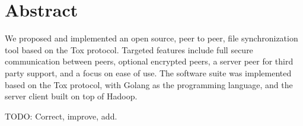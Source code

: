 \section*{Abstract}
\label{chap:abstract}

We proposed and implemented an open source, peer to peer, file synchronization tool based on the Tox protocol.
Targeted features include full secure communication between peers, optional encrypted peers, a server peer for third party support, and a focus on ease of use.
The software suite was implemented based on the Tox protocol, with Golang as the programming language, and the server client built on top of Hadoop.

TODO: Correct, improve, add.
